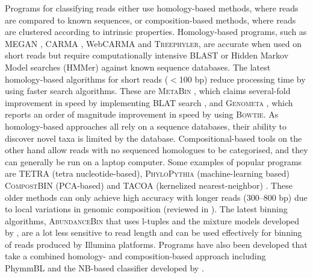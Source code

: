Programs for classifying reads either use homology-based methods, where reads are compared to known sequences, or composition-based methods, where reads are clustered according to intrinsic properties.
Homology-based programs, such as \textsc{MEGAN} \cite{Huson2007}, \textsc{CARMA} \cite{Krause2008}, WebCARMA \cite{Gerlach2009} and \textsc{Treephyler}, are accurate when used on short reads but require computationally intensive \acs{BLAST} or Hidden Markov Model searches (HMMer) against known sequence databases.
The latest homology-based algorithms for short reads ($<$100 bp) reduce processing time by using faster search algorithms.
These are \textsc{MetaBin} \cite{Sharma2012}, which claims several-fold improvement in speed by implementing \textsc{BLAT} search \cite{Kent2002}, and \textsc{Genometa} \cite{Davenport2012}, which reports an order of magnitude improvement in speed by using \textsc{Bowtie}.
As homology-based approaches all rely on a sequence databases, their ability to discover novel taxa is limited by the database.
Compositional-based tools on the other hand allow reads with no sequenced homologues to be categorised, and they can generally be run on a laptop computer.
Some examples of popular programs are \textsc{TETRA} \cite{Teeling2004} (tetra nucleotide-based), \textsc{PhyloPythia} (machine-learning based) \cite{McHardy2007} \textsc{CompostBIN} (\acs{PCA}-based) and \textsc{TACOA} (kernelized nearest-neighbor) \cite{Diaz2009}.
These older methods can only achieve high accuracy with longer reads (300--800 bp) due to local variations in genomic composition (reviewed in \citet{Teeling2012b}).
The latest binning algorithms, \textsc{AbundanceBin} that uses l-tuples \cite{Wu2011b} and the mixture models developed by \citet{Meinicke2011}, are a lot less sensitive to read length and can be used effectively for binning of reads produced by Illumina platforms.
Programs have also been developed that take a combined homology- and composition-based approach including PhymmBL \cite{Brady2009, Rosen2011} and the NB-based classifier developed by \citet{Parks2011}.

